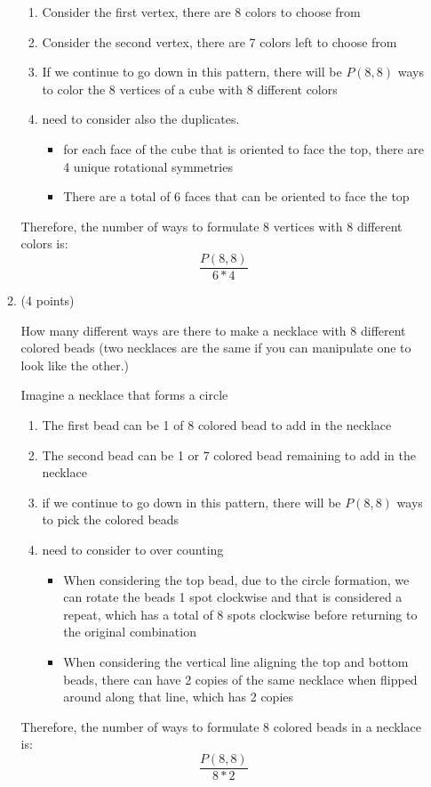 \documentclass[10pt,letterpaper,unboxed,cm]{article}
\begin{document}
\begin{enumerate}
\begin{enumerate}
\begin{enumerate}
    \item Consider the first vertex, there are 8 colors to choose from
    \item Consider the second vertex, there are 7 colors left to choose from
    \item If we continue to go down in this pattern, there will be $P(8, 8)$ ways to color the 8 vertices of a cube with 8 different colors
    \item need to consider also the duplicates. 
    \begin{itemize}
        \item for each face of the cube that is oriented to face the top, there are 4 unique rotational symmetries
        \item There are a total of 6 faces that can be oriented to face the top
    \end{itemize}
\end{enumerate}
Therefore, the number of ways to formulate 8 vertices with 8 different colors is: 
$$
    \frac{P(8, 8)}{6 * 4}
$$
\item
(4 points)

How many different ways are there to make a necklace with 8 different colored beads (two necklaces are the same if you can manipulate one to look like the other.)

Imagine a necklace that forms a circle
\begin{enumerate}
    \item The first bead can be 1 of 8 colored bead to add in the necklace
    \item The second bead can be 1 or 7 colored bead remaining to add in the necklace
    \item if we continue to go down in this pattern, there will be $P(8, 8)$ ways to pick the colored beads
    \item need to consider to over counting
    \begin{itemize}
        \item When considering the top bead, due to the circle formation, we can rotate the beads 1 spot clockwise and that is considered a repeat, which has a total of 8 spots clockwise before returning to the original combination
        \item When considering the vertical line aligning the top and bottom beads, there can have 2 copies of the same necklace when flipped around along that line, which has 2 copies
    \end{itemize}
\end{enumerate}
Therefore, the number of ways to formulate 8 colored beads in a necklace is:
$$
    \frac{P(8, 8)}{8 * 2}
$$
\end{enumerate}
\end{enumerate}
\end{document}
